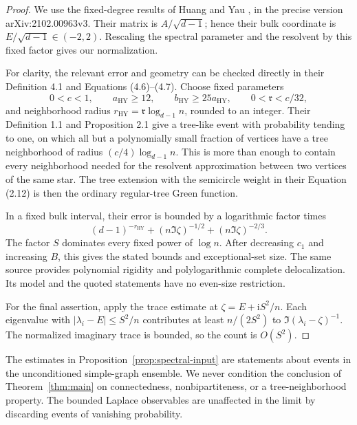 \begin{proof}
We use the fixed-degree results of Huang and Yau
\cite[Theorems 1.2, 1.4, and 4.2]{HuangYau}, in the precise version
arXiv:2102.00963v3.
Their matrix is \(A/\sqrt{d-1}\); hence their bulk coordinate is
\(E/\sqrt{d-1}\in(-2,2)\).
Rescaling the spectral parameter and the resolvent by this fixed factor
gives our normalization.

For clarity, the relevant error and geometry can be checked directly
in their Definition 4.1 and Equations (4.6)--(4.7).
Choose fixed parameters
\[
 0<c<1,\qquad a_{\mathrm{HY}}\ge12,\qquad
 b_{\mathrm{HY}}\ge25a_{\mathrm{HY}},\qquad
 0<\mathfrak r<c/32,
\]
and neighborhood radius
\(r_{\mathrm{HY}}=\mathfrak r\log_{d-1}n\), rounded to an integer.
Their Definition 1.1 and Proposition 2.1 give a tree-like event with
probability tending to one, on which all but a polynomially small
fraction of vertices have a tree neighborhood of radius
\((c/4)\log_{d-1}n\).
This is more than enough to contain every neighborhood needed for the
resolvent approximation between two vertices of the same star.
The tree extension with the semicircle weight in their Equation (2.12)
is then the ordinary regular-tree Green function.

In a fixed bulk interval, their error is bounded by a logarithmic
factor times
\[
 (d-1)^{-r_{\mathrm{HY}}}
 +(n\Im\zeta)^{-1/2}
 +(n\Im\zeta)^{-2/3}.
\]
The factor \(S\) dominates every fixed power of \(\log n\).
After decreasing \(c_1\) and increasing \(B\), this gives the stated
bounds and exceptional-set size. The same source provides polynomial
rigidity and polylogarithmic complete delocalization.
Its model and the quoted statements have no even-size restriction.

For the final assertion, apply the trace estimate at
\(\zeta=E+\mathrm iS^2/n\). Each eigenvalue with
\(|\lambda_i-E|\le S^2/n\) contributes at least
\(n/(2S^2)\) to \(\Im(\lambda_i-\zeta)^{-1}\).
The normalized imaginary trace is bounded, so the count is \(O(S^2)\).
\end{proof}

\begin{remark}
The estimates in Proposition~\ref{prop:spectral-input} are statements
about events in the unconditioned simple-graph ensemble. We never
condition the conclusion of Theorem~\ref{thm:main} on connectedness,
nonbipartiteness, or a tree-neighborhood property.
The bounded Laplace observables are unaffected in the limit by
discarding events of vanishing probability.
\end{remark}

